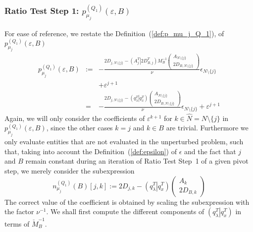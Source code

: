 \documentclass[a4paper]{article}
\newcommand{\pmu}[2]{\ensuremath{p_{\mu_{j}}^{(#1)}(\varepsilon, #2)}}
\begin{document}
\subsubsection{Ratio Test Step 1:
\pmu{Q_{1}}{B}}
For ease of reference, we restate the Definition~(\ref{def:p_mu_j_Q_1}),
of \pmu{Q_{1}}{B}
\begin{eqnarray*}
\pmu{Q_{1}}{B} &:=& 
  -\frac{2D_{j, N \setminus \{j\}} -
    \left(A_{j}^{T} \left| \right. 2D_{B, j}^{T} \right)
    M_{B}^{-1}
    \left(\begin{array}{c}
            A_{N \setminus \{j\}} \\
	    \hline
	    2D_{B,N \setminus \{j\}}
	  \end{array}
    \right)}{\nu}
  \epsilon_{N \setminus \{j\}}
\\
&&
  +\varepsilon^{j+1}
\\
&=&
  -\frac{2D_{j, N \setminus \{j\}} -
    \left(q_{\lambda}^{T} \left| \right. q_{x}^{T} \right)
    \left(\begin{array}{c}
            A_{N \setminus \{j\}} \\
	    \hline
	    2D_{B,N \setminus \{j\}}
	  \end{array}
    \right)}{\nu}
  \epsilon_{N \setminus \{j\}}
  +\varepsilon^{j+1}
\end{eqnarray*}
Again, we will only consider the coefficients of
$\varepsilon^{k+1}$ for $k \in \hat{N}= N \setminus \{j\}$ in
\pmu{Q_{1}}{B}, since the other cases $k=j$ and $k \in B$
are trivial. Furthermore we only evaluate entities that are not evaluated in the
unperturbed problem, such that, taking into account the
Definition~(\ref{def:epsilon}) of $\epsilon$
and the fact that $j$ and $B$ remain constant during an iteration of Ratio Test
Step~1 of a given pivot step, 
we merely consider the subexpression
\begin{equation}
\label{def:n_mu_j_Q_1}
n_{\mu_{j}}^{(Q_{1})}(B)[j,k]:=
2D_{j, k} -
    \left(q_{\lambda}^{T} \left| \right. q_{x}^{T} \right)
    \left(\begin{array}{c}
            A_{k} \\
	    \hline
	    2D_{B,k}
	  \end{array}
    \right)
\end{equation}
The correct value of the coefficient is obtained by scaling the subexpression
with the factor $\nu^{-1}$.
We shall first compute the different components of
$\left(q_{\lambda}^{T} \left|\right. q_{x}^{T}\right)$ in terms of
$\check{M}_{B}^{-1}$.
\end{document}
